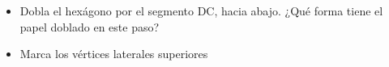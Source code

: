 \documentclass[10pt,twoside]{article}
\begin{document}
\begin{minipage}{.35\textwidth}
\end{minipage}
\begin{minipage}{.6\textwidth}
\begin{itemize}
\item Dobla el hexágono por el segmento DC, hacia abajo.
	 ¿Qué forma tiene el papel doblado en este paso?
\item Marca los vértices laterales superiores
\end{itemize}
\end{minipage}
\end{document}
